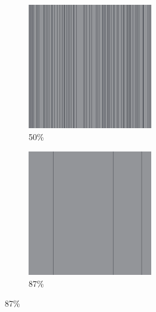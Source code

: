 \documentclass[12pt, fleqn]{report}                             %
\theoremstyle{break}                                            %
\begin{document}
\begin{figure}[ht!]
\begin{subfigure}[b]{0.4\linewidth}
          \includegraphics[width=0.6\textwidth]{Images/5/c.png}
          \caption{50\%}
        \end{subfigure}
        \begin{subfigure}[b]{0.4\linewidth}
          \includegraphics[width=0.6\textwidth]{Images/5/d.png}
          \caption{87\%}
        \end{subfigure}
      \end{figure}
\end{document}
